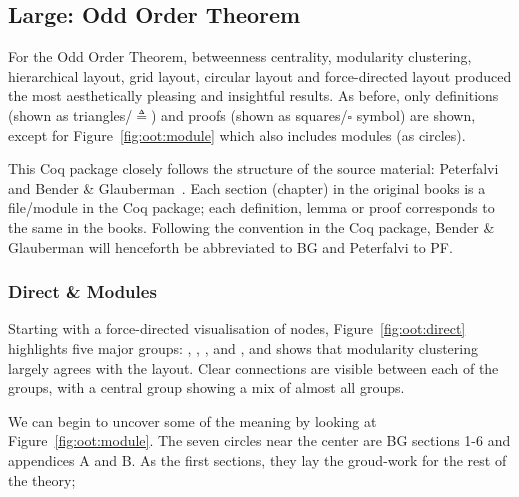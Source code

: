\subsection{Large: Odd Order Theorem}

For the Odd Order Theorem, betweenness centrality, modularity clustering,
hierarchical layout, grid layout, circular layout and force-directed layout
produced the most aesthetically pleasing and insightful results. As before,
only definitions (shown as triangles/$\triangleq$) and proofs (shown as
squares/$\square$ symbol) are shown, except for Figure~\ref{fig:oot:module}
which also includes modules (as circles).

This Coq package closely follows the structure of the source material:
Peterfalvi~\cite{peterfalvi2000oot} and Bender \&
Glauberman~\cite{bender1994oot}. Each section (chapter) in the original books is
a file/module in the Coq package; each definition, lemma or proof corresponds to
the same in the books. Following the convention in the Coq package, Bender \&
Glauberman will henceforth be abbreviated to BG and Peterfalvi to PF.

\subsubsection{Direct \& Modules}

Starting with a force-directed visualisation of nodes,
Figure~\ref{fig:oot:direct} highlights five major groups: ,
, ,  and , and
shows that modularity clustering largely agrees with the layout. Clear
connections are visible between each of the groups, with a central group showing
a mix of almost all groups.

We can begin to uncover some of the meaning by looking at
Figure~\ref{fig:oot:module}. The seven  circles near the center
are BG sections 1-6 and appendices A and B. As the first sections, they lay the
groud-work for the rest of the theory; %





